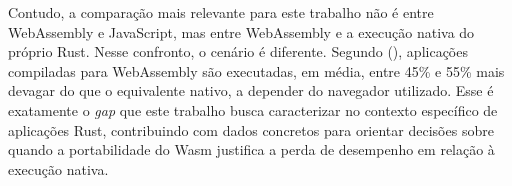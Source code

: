 Contudo, a comparação mais relevante para este trabalho não é entre WebAssembly e JavaScript, mas entre WebAssembly e a execução nativa do próprio Rust. Nesse confronto, o cenário é diferente. Segundo  (\citeyear{jangda2019}), aplicações compiladas para WebAssembly são executadas, em média, entre 45\% e 55\% mais devagar do que o equivalente nativo, a depender do navegador utilizado. Esse é exatamente o \emph{gap} que este trabalho busca caracterizar no contexto específico de aplicações Rust, contribuindo com dados concretos para orientar decisões sobre quando a portabilidade do Wasm justifica a perda de desempenho em relação à execução nativa.
